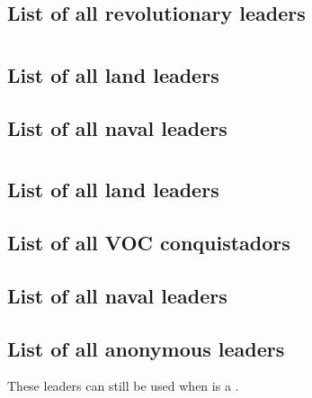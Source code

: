 \subsection{List of all revolutionary leaders}
\list@anonyme

\section{\paysmajeurEspagne}
\subsection{List of all land leaders}
\subsection{List of all naval leaders}
\list@anonyme

\section{\paysmajeurHollande}
\subsection{List of all land leaders}
\subsection{List of all VOC conquistadors}
\subsection{List of all naval leaders}
\subsection{List of all anonymous leaders}
\aparag These leaders can still be used when \paysHollande is a \MIN.
\listanonymehollande

